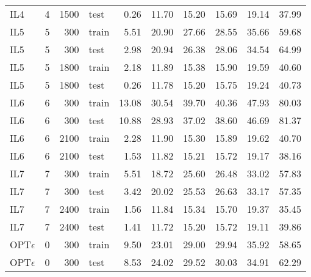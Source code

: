 \begin{table}[ht]
\begin{tabular}{lrrlrrrrrr}
  IL4 & 4 & 1500 & test & 0.26 & 11.70 & 15.20 & 15.69 & 19.14 & 37.99 \\ 
  IL5 & 5 & 300 & train & 5.51 & 20.90 & 27.66 & 28.55 & 35.66 & 59.68 \\ 
  IL5 & 5 & 300 & test & 2.98 & 20.94 & 26.38 & 28.06 & 34.54 & 64.99 \\ 
  IL5 & 5 & 1800 & train & 2.18 & 11.89 & 15.38 & 15.90 & 19.59 & 40.60 \\ 
  IL5 & 5 & 1800 & test & 0.26 & 11.78 & 15.20 & 15.75 & 19.24 & 40.73 \\ 
  IL6 & 6 & 300 & train & 13.08 & 30.54 & 39.70 & 40.36 & 47.93 & 80.03 \\ 
  IL6 & 6 & 300 & test & 10.88 & 28.93 & 37.02 & 38.60 & 46.69 & 81.37 \\ 
  IL6 & 6 & 2100 & train & 2.28 & 11.90 & 15.30 & 15.89 & 19.62 & 40.70 \\ 
  IL6 & 6 & 2100 & test & 1.53 & 11.82 & 15.21 & 15.72 & 19.17 & 38.16 \\ 
  IL7 & 7 & 300 & train & 5.51 & 18.72 & 25.60 & 26.48 & 33.02 & 57.83 \\ 
  IL7 & 7 & 300 & test & 3.42 & 20.02 & 25.53 & 26.63 & 33.17 & 57.35 \\ 
  IL7 & 7 & 2400 & train & 1.56 & 11.84 & 15.34 & 15.70 & 19.37 & 35.45 \\ 
  IL7 & 7 & 2400 & test & 1.41 & 11.72 & 15.20 & 15.72 & 19.11 & 39.86 \\ 
  OPT$\epsilon$ & 0 & 300 & train & 9.50 & 23.01 & 29.00 & 29.94 & 35.92 & 
  58.65 \\ 
  OPT$\epsilon$ & 0 & 300 & test & 8.53 & 24.02 & 29.52 & 30.03 & 34.91 & 
  62.29 \\ 
  \bottomrule
\end{tabular}
\end{table}